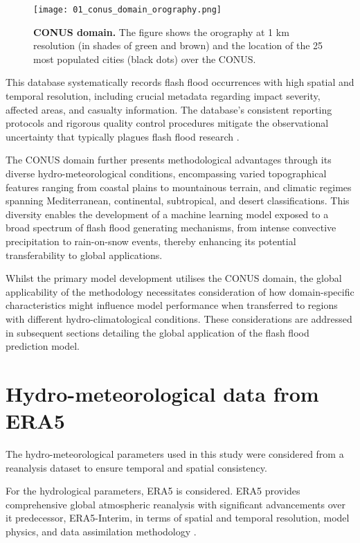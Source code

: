 \begin{figure}[htbp]
\centering
\texttt{[image: 01\_conus\_domain\_orography.png]}
\caption{\textbf{CONUS domain.} The figure shows the orography at 1 km resolution (in shades of green and brown) and the location of the 25 most populated cities (black dots) over the CONUS.}
\label{fig:conus_domain}
\end{figure}

This database systematically records flash flood occurrences with high spatial and temporal resolution, including crucial metadata regarding impact severity, affected areas, and casualty information. The database's consistent reporting protocols and rigorous quality control procedures mitigate the observational uncertainty that typically plagues flash flood research \citep{Panwar_2020}.

The CONUS domain further presents methodological advantages through its diverse hydro-meteorological conditions, encompassing varied topographical features ranging from coastal plains to mountainous terrain, and climatic regimes spanning Mediterranean, continental, subtropical, and desert classifications. This diversity enables the development of a machine learning model exposed to a broad spectrum of flash flood generating mechanisms, from intense convective precipitation to rain-on-snow events, thereby enhancing its potential transferability to global applications.

Whilst the primary model development utilises the CONUS domain, the global applicability of the methodology necessitates consideration of how domain-specific characteristics might influence model performance when transferred to regions with different hydro-climatological conditions. These considerations are addressed in subsequent sections detailing the global application of the flash flood prediction model.


\section{Hydro-meteorological data from ERA5}

The hydro-meteorological parameters used in this study were considered from a reanalysis dataset to ensure temporal and spatial consistency. 

For the hydrological parameters, ERA5 is considered. ERA5 provides comprehensive global atmospheric reanalysis with significant advancements over it predecessor, ERA5-Interim, in terms of spatial and temporal resolution, model physics, and data assimilation methodology \citep{Hersbach_2020}. 


